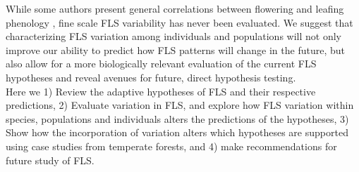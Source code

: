 \documentclass[12pt]{article}\usepackage[]{graphicx}\usepackage[]{color}
\begin{document}
While some authors present general correlations between flowering and leafing phenology \citep{Lechowicz_1995, Ettinger2018}, fine scale FLS variability has never been evaluated. We suggest that characterizing FLS variation among individuals and populations will not only improve our ability to predict how FLS patterns will change in the future, but also allow for a more biologically relevant evaluation of the current FLS hypotheses and reveal avenues for future, direct hypothesis testing.\\
\indent Here we 1) Review the adaptive hypotheses of FLS and their respective predictions, 2) Evaluate variation in FLS, and explore how FLS variation within species, populations and individuals alters the predictions of the hypotheses, 3) Show how the incorporation of variation alters which hypotheses are supported using case studies from temperate forests, and 4) make recommendations for future study of FLS. 
\end{document}
